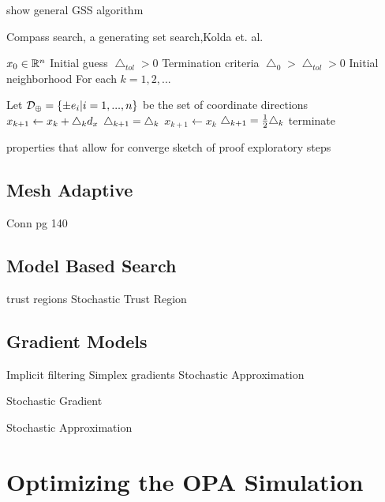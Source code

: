show general GSS algorithm

\begin{algorithm}
\caption{Compass search, a generating set search,Kolda et. al. \cite{kolda_2003}}\label{dfo_genset}
\begin{algorithmic}
\State $x_0 \in \mathbb{R}^{n}$ Initial guess
\State $\bigtriangleup_{tol} >0$ Termination criteria
\State $\bigtriangleup_0 > \bigtriangleup_{tol} >0$ Initial neighborhood
\BState For each $k=1,2,...$

\State Let $\mathcal{D}_\oplus =\left\{ \pm e_i| i=1,...,n\right\}$ be the set of coordinate directions
\State $x_{k+1} \gets x_k + \bigtriangleup_k d_x$
\State $\bigtriangleup_{k+1} = \bigtriangleup_k$
\Else
\State $x_{k+1} \gets x_k$
\State $\bigtriangleup_{k+1} = \frac{1}{2} \bigtriangleup_k$
 terminate \EndIf
\EndIf
\EndProcedure
\end{algorithmic}
\end{algorithm}

properties that allow for converge
sketch of proof
exploratory steps

\subsection*{Mesh Adaptive}
Conn pg 140

\subsection{Model Based Search}
trust regions
Stochastic Trust Region \endnote{}

\subsection*{Gradient Models}
Implicit filtering
Simplex gradients
Stochastic Approximation

Stochastic Gradient \endnote{}

Stochastic Approximation \endnote{}





\section{Optimizing the OPA Simulation}



